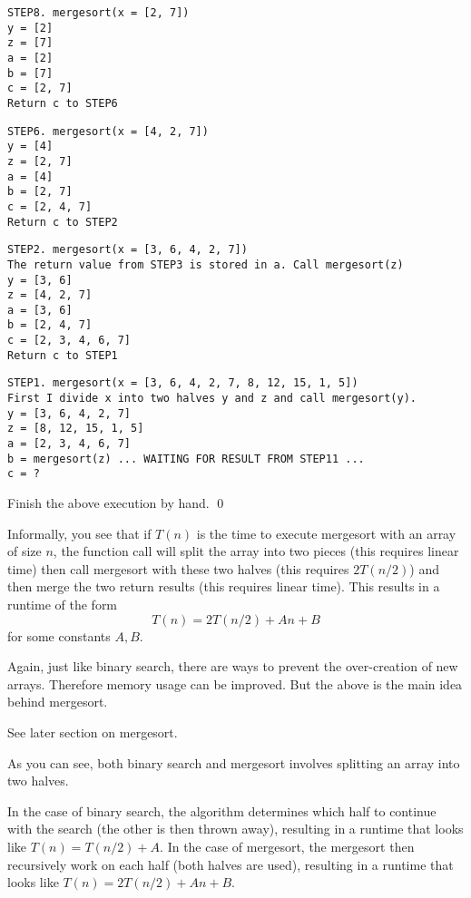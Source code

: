 \begin{Verbatim}[frame=single, fontsize=\footnotesize]
STEP8. mergesort(x = [2, 7])
y = [2]
z = [7]
a = [2]
b = [7]
c = [2, 7]
Return c to STEP6 
\end{Verbatim}

\begin{Verbatim}[frame=single, fontsize=\footnotesize]
STEP6. mergesort(x = [4, 2, 7])
y = [4]
z = [2, 7]
a = [4]
b = [2, 7]
c = [2, 4, 7]
Return c to STEP2
\end{Verbatim}

\begin{Verbatim}[frame=single, fontsize=\footnotesize]
STEP2. mergesort(x = [3, 6, 4, 2, 7])
The return value from STEP3 is stored in a. Call mergesort(z)
y = [3, 6]
z = [4, 2, 7]
a = [3, 6]
b = [2, 4, 7]
c = [2, 3, 4, 6, 7]
Return c to STEP1
\end{Verbatim}

\begin{Verbatim}[frame=single, fontsize=\footnotesize]
STEP1. mergesort(x = [3, 6, 4, 2, 7, 8, 12, 15, 1, 5])
First I divide x into two halves y and z and call mergesort(y).
y = [3, 6, 4, 2, 7]
z = [8, 12, 15, 1, 5]
a = [2, 3, 4, 6, 7]
b = mergesort(z) ... WAITING FOR RESULT FROM STEP11 ...
c = ?
\end{Verbatim}

\begin{ex}
Finish the above execution by hand.
\qed
\end{ex}



\newpage
Informally, you see that if $T(n)$ is the time to execute
mergesort with an array of size $n$, the function call
will split the array into two pieces (this requires linear time)
then call mergesort with these two halves (this requires $2T(n/2)$)
and then merge the two return results (this requires linear time). 
This results in a runtime of the form
\[
T(n) = 2T(n/2) + An + B
\]
for some constants $A,B$.

Again, just like binary search, there are ways to prevent
the over-creation of new arrays. 
Therefore memory usage can be improved.
But the above is the main idea behind mergesort.

See later section on mergesort.

As you can see, both binary search and mergesort involves
splitting an array into two halves.
\begin{itemize}
\li In the case of binary search, the algorithm determines which
half to continue with the search (the other is then thrown away), 
resulting in a runtime that looks like
$T(n) = T(n/2) + A$.
\li In the case of mergesort, the mergesort then recursively
work on each half (both halves are used), resulting in 
a runtime that looks like
$T(n) = 2T(n/2) + An + B$.
\end{itemize}

